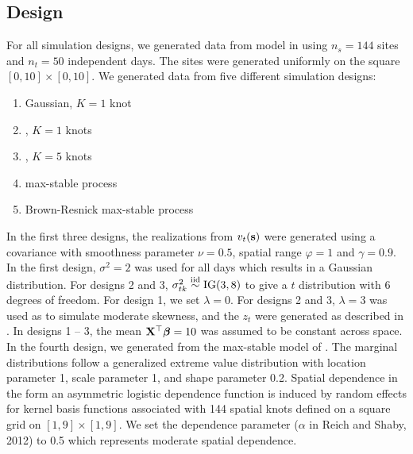 \subsection{Design}\label{sts:simdesign}
For all simulation designs, we generated data from model  in  using $n_s=144$ sites and $n_t=50$ independent days.
The sites were generated uniformly on the square $[0, 10] \times [0, 10]$.
We generated data from five different simulation designs:
\begin{enumerate}
  \item Gaussian, $K=1$ knot
  \item \Skewt, $K=1$ knots
  \item \Skewt, $K=5$ knots
  \item \citet{Reich2012} max-stable process %
  \item Brown-Resnick max-stable process \citep{Kabluchko2009} %
\end{enumerate}
In the first three designs, the realizations from $v_t(\mathbf{s})$ were generated using a \Matern covariance with smoothness parameter $\nu = 0.5$, spatial range $\varphi = 1$ and $\gamma = 0.9$.
In the first design, $\sigma^2 = 2$ was used for all days which results in a Gaussian distribution.
For designs 2 and 3, $\sigma^2_{tk} \stackrel{\mathrm{iid}}{\sim} \text{IG}(3, 8)$ to give a $t$ distribution with 6 degrees of freedom.
For design 1, we set $\lambda = 0$.
For designs 2 and 3, $\lambda = 3$ was used as to simulate moderate skewness, and the $z_t$ were generated as described in .
In designs 1 -- 3, the mean $\mathbf{X}^\top \mbox{\boldmath $\beta$} = 10$ was assumed to be constant across space.
In the fourth design, we generated from the max-stable model of \citet{Reich2012}.
The marginal distributions follow a generalized extreme value distribution with location parameter 1, scale parameter 1, and shape parameter 0.2.
Spatial dependence in the form an asymmetric logistic dependence function is induced by random effects for kernel basis functions associated with 144 spatial knots defined on a square grid on $[1,9] \times [1,9]$.
We set the dependence parameter ($\alpha$ in Reich and Shaby, 2012) to 0.5 which represents moderate spatial dependence.
